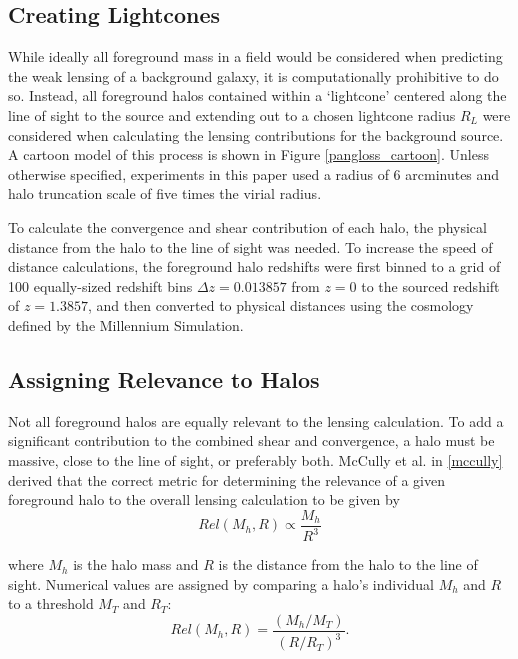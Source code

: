 \documentclass[%
 reprint,
 amsmath,amssymb,
 aps,nofootinbib
]{revtex4-1}
\begin{document}
\subsection{Creating Lightcones}

While ideally all foreground mass in a field would be considered when predicting the weak lensing of a background galaxy, it is computationally prohibitive to do so. Instead, all foreground halos contained within a `lightcone' centered along the line of sight to the source and extending out to a chosen lightcone radius $R_L$ were considered when calculating the lensing contributions for the background source. A cartoon model of this process is shown in Figure \ref{pangloss_cartoon}. Unless otherwise specified, experiments in this paper used a radius of 6 arcminutes and halo truncation scale of five times the virial radius.

To calculate the convergence and shear contribution of each halo, the physical distance from the halo to the line of sight was needed. To increase the speed of distance calculations, the foreground halo redshifts were first binned to a grid of 100 equally-sized redshift bins $\Delta z=0.013857$ from $z=0$ to the sourced redshift of $z=1.3857$, and then converted to physical distances using the cosmology defined by the Millennium Simulation.

\subsection{Assigning Relevance to Halos}

Not all foreground halos are equally relevant to the lensing calculation. To add a significant contribution to the combined shear and convergence, a halo must be massive, close to the line of sight, or preferably both. McCully et al. in \ref{mccully} derived that the correct metric for determining the relevance of a given foreground halo to the overall lensing calculation to be given by
\begin{equation}\label{relevant}
Rel(M_h,R)\propto\frac{M_h}{R^3}
\end{equation}

\noindent where $M_h$ is the halo mass and $R$ is the distance from the halo to the line of sight. Numerical values are assigned by comparing a halo's individual $M_h$ and $R$ to a threshold $M_T$ and $R_T$:
\begin{equation}\label{relevant_thresh}
Rel(M_h,R)=\frac{(M_h/M_T)}{(R/R_T)^3}.
\end{equation}
\end{document}
